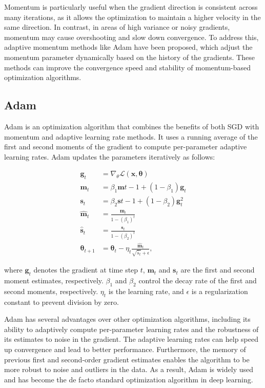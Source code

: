Momentum is particularly useful when the gradient direction is consistent across many iterations, as it allows the optimization to maintain a higher velocity in the same direction.
In contrast, in areas of high variance or noisy gradients, momentum may cause overshooting and slow down convergence.
To address this, adaptive momentum methods like Adam have been proposed, which adjust the momentum parameter dynamically based on the history of the gradients.
These methods can improve the convergence speed and stability of momentum-based optimization algorithms.


\subsection{Adam}
Adam is an optimization algorithm that combines the benefits of both SGD with momentum and adaptive learning rate methods.
It uses a running average of the first and second moments of the gradient to compute per-parameter adaptive learning rates.
Adam updates the parameters iteratively as follows:

\begin{align}
\mathbf{g}_t &= \nabla_\theta \mathcal{L}(\mathbf{x}, \boldsymbol{\theta}) \\
\mathbf{m}_t &= \beta_1 \mathbf{m}{t-1} + (1-\beta_1) \mathbf{g}_t \\
\mathbf{s}_t &= \beta_2 \mathbf{s}{t-1} + (1-\beta_2) \mathbf{g}_t^2\\
\hat{\mathbf{m}}_t &= \frac{\mathbf{m}_t}{1 - (\beta_1)^t} \\
\hat{\mathbf{s}}_t &= \frac{\mathbf{s}_t}{1 - (\beta_2)^t} \\
\boldsymbol{\theta}_{t+1} &= \boldsymbol{\theta}_t - \eta_t \frac{\hat{\mathbf{m}}_t}{\sqrt{\hat{s}_t} + \epsilon},
\end{align}

where $\mathbf{g}_t$ denotes the gradient at time step $t$, $\mathbf{m}_t$ and $\mathbf{s}_t$ are the first and second moment estimates, respectively.
$\beta_1$ and $\beta_2$ control the decay rate of the first and second moments, respectively.
$\eta_t$ is the learning rate, and $\epsilon$ is a regularization constant to prevent division by zero.

Adam has several advantages over other optimization algorithms, including its ability to adaptively compute per-parameter learning rates and the robustness of its estimates to noise in the gradient.
The adaptive learning rates can help speed up convergence and lead to better performance.
Furthermore, the memory of previous first and second-order gradient estimates enables the algorithm to be more robust to noise and outliers in the data.
As a result, Adam is widely used and has become the de facto standard optimization algorithm in deep learning.


